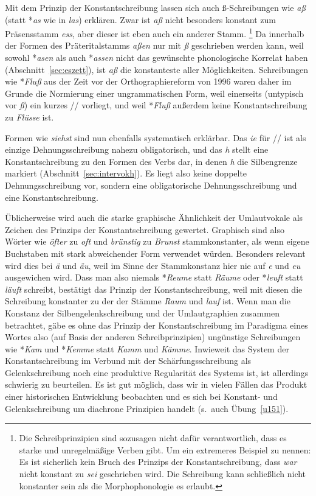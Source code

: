 Mit dem Prinzip der Konstantschreibung lassen sich auch ß-Schreibungen wie \textit{aß} (statt *\textit{as} wie in \textit{las}) erklären.
Zwar ist \textit{aß} nicht besonders konstant zum Präsensstamm \textit{ess}, aber dieser ist eben auch ein anderer Stamm.%
\footnote{Die Schreibprinzipien sind sozusagen nicht dafür verantwortlich, dass es starke und unregelmäßige Verben gibt.
Um ein extremeres Beispiel zu nennen:
Es ist sicherlich kein Bruch des Prinzips der Konstantschreibung, dass \textit{war} nicht konstant zu \textit{sei} geschrieben wird.
Die Schreibung kann schließlich nicht konstanter sein als die Morphophonologie es erlaubt.}
Da innerhalb der Formen des Präteritalstamms \textit{aßen} nur mit \textit{ß} geschrieben werden kann, weil sowohl *\textit{asen} als auch *\textit{assen} nicht das gewünschte phonologische Korrelat haben (Abschnitt~\ref{sec:eszett}), ist \textit{aß} die konstanteste aller Möglichkeiten.
Schreibungen wie *\textit{Fluß} aus der Zeit vor der Orthographiereform von 1996 waren daher im Grunde die Normierung einer ungrammatischen Form, weil einerseits (untypisch vor \textit{ß}) ein kurzes // vorliegt, und weil *\textit{Fluß} außerdem keine Konstantschreibung zu \textit{Flüsse} ist.

Formen wie \textit{siehst} sind nun ebenfalls systematisch erklärbar.
Das \textit{ie} für // ist als einzige Dehnungsschreibung nahezu obligatorisch, und das \textit{h} stellt eine Konstantschreibung zu den Formen des Verbs dar, in denen \textit{h} die Silbengrenze markiert (Abschnitt~\ref{sec:intervokh}).
Es liegt also keine doppelte Dehnungsschreibung vor, sondern eine obligatorische Dehnungsschreibung und eine Konstantschreibung.

Üblicherweise wird auch die starke graphische Ähnlichkeit der Umlautvokale als Zeichen des Prinzips der Konstantschreibung gewertet.
Graphisch sind also Wörter wie \textit{öfter} zu \textit{oft} und \textit{brünstig} zu \textit{Brunst} stammkonstanter, als wenn eigene Buchstaben mit stark abweichender Form verwendet würden.
Besonders relevant wird dies bei \textit{ä} und \textit{äu}, weil im Sinne der Stammkonstanz hier nie auf \textit{e} und \textit{eu} ausgewichen wird.
Dass man also niemals *\textit{Reume} statt \textit{Räume} oder *\textit{leuft} statt \textit{läuft} schreibt, bestätigt das Prinzip der Konstantschreibung, weil mit diesen die Schreibung konstanter zu der der Stämme \textit{Raum} und \textit{lauf} ist.
Wenn man die Konstanz der Silbengelenkschreibung und der Umlautgraphien zusammen betrachtet, gäbe es ohne das Prinzip der Konstantschreibung im Paradigma eines Wortes also (auf Basis der anderen Schreibprinzipien) ungünstige Schreibungen wie *\textit{Kam} und *\textit{Kemme} statt \textit{Kamm} und \textit{Kämme}.
Inwieweit das System der Konstantschreibung im Verbund mit der Schärfungsschreibung als Gelenkschreibung noch eine produktive Regularität des Systems ist, ist allerdings schwierig zu beurteilen.
Es ist gut möglich, dass wir in vielen Fällen das Produkt einer historischen Entwicklung beobachten und es sich bei Konstant- und Gelenkschreibung um diachrone Prinzipien handelt (s.\ auch Übung~\ref{u151}).

